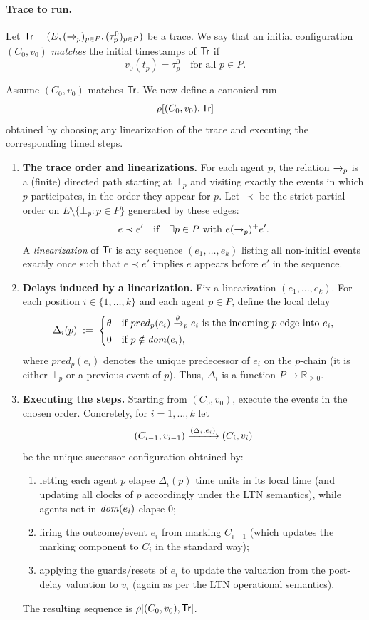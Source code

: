 \medskip

\paragraph{Trace to run.}
Let $\textsf{Tr}=(E,(\xrightarrow{}_p)_{p\in P},(\tau_p^0)_{p\in P})$ be a trace.
We say that an initial configuration $(C_0,v_0)$ \emph{matches} the initial timestamps of $\textsf{Tr}$ if
\[
v_0(t_p)=\tau_p^0 \quad\text{for all } p\in P.
\]

Assume $(C_0,v_0)$ matches $\textsf{Tr}$. We now define a canonical run
\[
\rho[(C_0,v_0),\textsf{Tr}]
\]
obtained by choosing any linearization of the trace and executing the corresponding timed steps.

\begin{enumerate}
\item \textbf{The trace order and linearizations.}
For each agent $p$, the relation $\xrightarrow{}_p$ is a (finite) directed path starting at $\bot_p$ and visiting exactly the events in which $p$ participates, in the order they appear for $p$.
Let $\prec$ be the strict partial order on $E\setminus\{\bot_p:p\in P\}$ generated by these edges:
\[
e \prec e' \quad\text{if}\quad \exists p\in P \text{ with } e(\xrightarrow{}_p)^+ e'.
\]
A \emph{linearization} of $\textsf{Tr}$ is any sequence $(e_1,\ldots,e_k)$ listing all non-initial events exactly once such that $e\prec e'$ implies $e$ appears before $e'$ in the sequence.

\item \textbf{Delays induced by a linearization.}
Fix a linearization $(e_1,\ldots,e_k)$. For each position $i\in\{1,\ldots,k\}$ and each agent $p\in P$, define the local delay
\[
\Delta_i(p)\;:=\;
\begin{cases}
\theta & \text{if } pred_p(e_i)\xrightarrow{\theta}_p e_i \text{ is the incoming $p$-edge into } e_i,\\[2pt]
0 & \text{if } p\notin \mathit{dom}(e_i),
\end{cases}
\]
where $pred_p(e_i)$ denotes the unique predecessor of $e_i$ on the $p$-chain (it is either $\bot_p$ or a previous event of $p$).  
Thus, $\Delta_i$ is a function $P\to \mathbb{R}_{\ge 0}$.

\item \textbf{Executing the steps.}
Starting from $(C_0,v_0)$, execute the events in the chosen order. Concretely, for $i=1,\ldots,k$ let
\[
(C_{i-1},v_{i-1}) \xrightarrow{(\Delta_i,e_i)} (C_i,v_i)
\]
be the unique successor configuration obtained by:
\begin{enumerate}
\item letting each agent $p$ elapse $\Delta_i(p)$ time units in its local time (and updating all clocks of $p$ accordingly under the LTN semantics), while agents not in $\mathit{dom}(e_i)$ elapse $0$;
\item firing the outcome/event $e_i$ from marking $C_{i-1}$ (which updates the marking component to $C_i$ in the standard way);
\item applying the guards/resets of $e_i$ to update the valuation from the post-delay valuation to $v_i$ (again as per the LTN operational semantics).
\end{enumerate}
The resulting sequence is $\rho[(C_0,v_0),\textsf{Tr}]$.

\end{enumerate}

